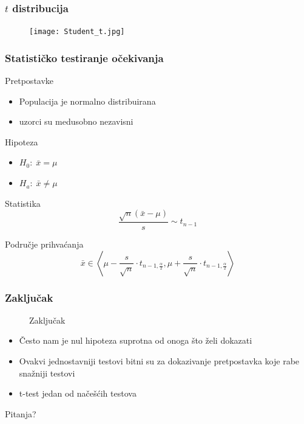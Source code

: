 \documentclass{beamer}
\begin{document}
\begin{frame}
	\frametitle{$t$ distribucija}
	\begin{figure}
		\centering
	    \texttt{[image: Student\_t.jpg]}
	\end{figure}
\end{frame}

\begin{frame}
	\frametitle{Statističko testiranje očekivanja}
	\begin{block}{Pretpostavke}
		\begin{itemize}
			\item Populacija je normalno distribuirana
			\item uzorci su medusobno nezavisni
		\end{itemize}
	\end{block}
	\begin{block}{Hipoteza}
		\begin{itemize}
			\item $H_0:\; \bar{x} = \mu$
			\item $H_a:\; \bar{x} \ne \mu$
		\end{itemize}
	\end{block}
	\begin{block}{Statistika}
		\[\frac{\sqrt{n} (\bar{x} - \mu)}{s} \sim t_{n-1}\]
	\end{block}
	\begin{block}{Područje prihvaćanja}
		\[
		\bar{x} \in \left<\mu - \frac{s}{\sqrt{n}} \cdot t_{n-1, \frac{\alpha}{2}}, \mu + \frac{s}{\sqrt{n}} \cdot t_{n-1, \frac{\alpha}{2}} \right> \]

	\end{block}
\end{frame}

\begin{frame}
	\frametitle{Zaključak}
	\begin{figure}
		\centering
		\huge Zaključak
	\end{figure}

	\begin{itemize}
		\item Često nam je nul hipoteza suprotna od onoga što želi dokazati
		\item Ovakvi jednostavniji testovi bitni su za dokazivanje pretpostavka koje rabe snažniji testovi
		\item t-test jedan od načešćih testova 
	\end{itemize}
\end{frame}

\begin{frame}
	\Huge{\centerline{Pitanja?}}
\end{frame}
\end{document}
